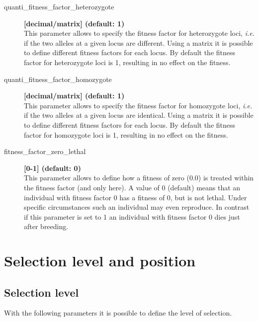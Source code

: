 \documentclass[letterpaper,12pt,oneside]{book}
\begin{document}
\begin{description}
\item[quanti\_fitness\_factor\_heterozygote] \textbf{[decimal/matrix] (default: 1)}\\
This parameter allows to specify the fitness factor for heterozygote loci, \textit{i.e.} if the two alleles at a given locus are different. Using a matrix it is possible to define different fitness factors for each locus. By default the fitness factor for heterozygote loci is 1, resulting in no effect on the fitness. 

\item[quanti\_fitness\_factor\_homozygote] \textbf{[decimal/matrix] (default: 1)}\\
This parameter allows to specify the fitness factor for homozygote loci, \textit{i.e.} if the two alleles at a given locus are identical. Using a matrix it is possible to define different fitness factors for each locus. By default the fitness factor for homozygote loci is 1, resulting in no effect on the fitness. 

\item[fitness\_factor\_zero\_lethal] \textbf{[0-1] (default: 0)}\\
This parameter allows to define how a fitness of zero (0.0) is treated within the fitness factor (and only here). A value of 0 (default) means that an individual with fitness factor  0 has a fitness of 0, but is not lethal. Under specific circumstances such an individual may even reproduce. In contrast if this parameter is set to 1 an individual with fitness factor 0 dies just after breeding.
\end{description}

\section{Selection level and position}
\subsection{Selection level}
With the following parameters it is possible to define the level of selection.
\end{document}
